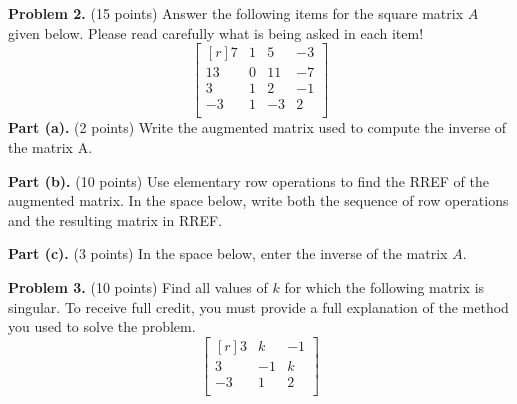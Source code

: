 \documentclass[12pt]{article}
\begin{document}
\clearpage


\textbf{Problem 2.} (15 points) Answer the following items for the square matrix $A$ given below. Please read carefully what is being asked in each item!
\[
\begin{bmatrix*}[r]7&1&5&-3\\13&0&11&-7\\3&1&2&-1\\-3&1&-3&2\\\end{bmatrix*}
\]
\textbf{Part (a).} (2 points) Write the augmented matrix used to compute the inverse of the matrix A.

\vskip1.5in

\textbf{Part (b).} (10 points) Use elementary row operations to find the RREF of the augmented matrix.
In the space below, write both the sequence of row operations and the resulting matrix in RREF.

\vskip3.5in

\textbf{Part (c).} (3 points) In the space below, enter the inverse of the matrix $A$.

\clearpage

\textbf{Problem 3.} (10 points) Find all values of $k$ for which the following matrix is singular. To receive full credit, you must provide a full explanation of the method you used to solve the problem.
\[
\begin{bmatrix*}[r]3&k&-1\\3&-1&k\\-3&1&2\\\end{bmatrix*}
\]

\clearpage
\end{document}
